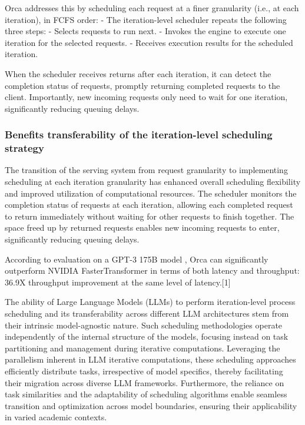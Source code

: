 \documentclass[conference]{IEEEtran}
\begin{document}
Orca addresses this by scheduling each request at a finer granularity (i.e., at each iteration), in FCFS order:
- The iteration-level scheduler repeats the following three steps:
- Selects requests to run next.
- Invokes the engine to execute one iteration for the selected requests.
- Receives execution results for the scheduled iteration.

When the scheduler receives returns after each iteration, it can detect the completion status of requests, promptly returning completed requests to the client. Importantly, new incoming requests only need to wait for one iteration, significantly reducing queuing delays.

\subsubsection{Benefits transferability of the iteration-level scheduling strategy}


The transition of the serving system from request granularity to implementing scheduling at each iteration granularity has enhanced overall scheduling flexibility and improved utilization of computational resources.
The scheduler monitors the completion status of requests at each iteration, allowing each completed request to return immediately without waiting for other requests to finish together. The space freed up by returned requests enables new incoming requests to enter, significantly reducing queuing delays.

According to evaluation on a GPT-3 175B model , Orca can significantly outperform NVIDIA FasterTransformer in terms of both latency and throughput: 36.9X throughput improvement at the same level of latency.[1]


The ability of Large Language Models (LLMs) to perform iteration-level process scheduling and its transferability across different LLM architectures stem from their intrinsic model-agnostic nature. Such scheduling methodologies operate independently of the internal structure of the models, focusing instead on task partitioning and management during iterative computations. Leveraging the parallelism inherent in LLM iterative computations, these scheduling approaches efficiently distribute tasks, irrespective of model specifics, thereby facilitating their migration across diverse LLM frameworks. Furthermore, the reliance on task similarities and the adaptability of scheduling algorithms enable seamless transition and optimization across model boundaries, ensuring their applicability in varied academic contexts.
\end{document}

